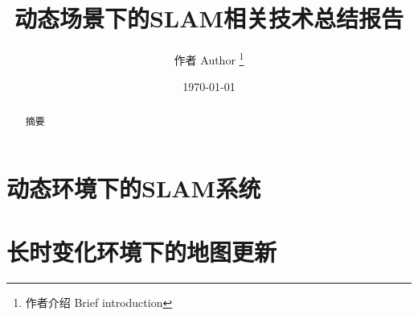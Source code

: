 \documentclass[12pt,a4paper]{article}
\title{动态场景下的SLAM相关技术总结报告}
\author{ 作者 Author \thanks{作者介绍 Brief introduction} }
\date{\today}
\begin{document}
\begin{abstract}
	摘要	
\end{abstract}

\maketitle

\section{动态环境下的SLAM系统}
\label{sec:slam}




\section{长时变化环境下的地图更新}
\label{sec:mapping}






	
\end{document}

